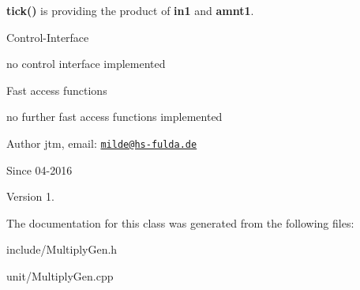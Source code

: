 \begin{DoxyItemize}
\item {\bfseries tick()} is providing the product of {\bfseries in1} and {\bfseries amnt1}.
\end{DoxyItemize}

Control-\/\+Interface
\begin{DoxyItemize}
\item no control interface implemented
\end{DoxyItemize}

Fast access functions
\begin{DoxyItemize}
\item no further fast access functions implemented
\end{DoxyItemize}

\begin{DoxyAuthor}{Author}
jtm, email\+:  \href{mailto:milde@hs-fulda.de}{\tt milde@hs-\/fulda.\+de} 
\end{DoxyAuthor}
\begin{DoxySince}{Since}
04-\/2016 
\end{DoxySince}
\begin{DoxyVersion}{Version}
1. 
\end{DoxyVersion}


The documentation for this class was generated from the following files\+:\begin{DoxyCompactItemize}
\item 
include/Multiply\+Gen.\+h\item 
unit/Multiply\+Gen.\+cpp\end{DoxyCompactItemize}
